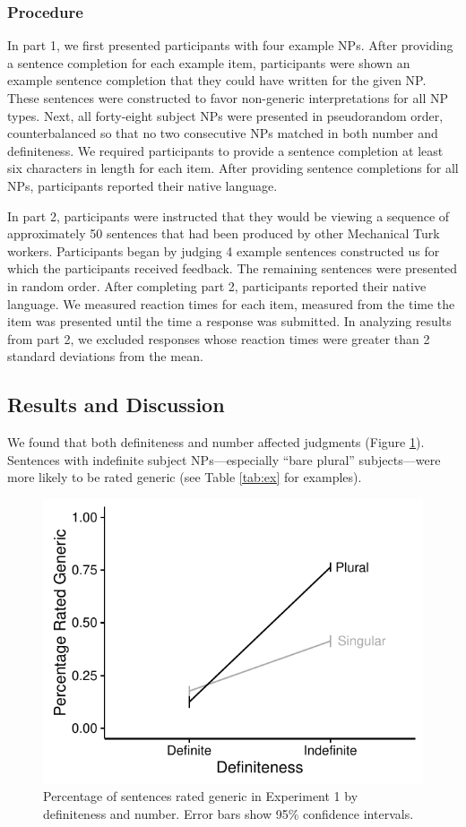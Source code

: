 \documentclass[10pt,letterpaper]{article}
\begin{document}
\subsubsection{Procedure}

In part 1, we first presented participants with four example NPs. After providing a sentence completion for each example item, participants were shown an example sentence completion that they could have written for the given NP. These sentences were constructed to favor non-generic interpretations for all NP types. Next, all forty-eight subject NPs were presented in pseudorandom order, counterbalanced so that no two consecutive NPs matched in both number and definiteness. We required participants to provide a sentence completion at least six characters in length for each item. After providing sentence completions for all NPs, participants reported their native language.

In part 2, participants were instructed that they would be viewing a sequence of approximately 50 sentences that had been produced by other Mechanical Turk workers. Participants began by judging 4 example sentences constructed us for which the participants received feedback. The remaining sentences were presented in random order. After completing part 2, participants reported their native language. We measured reaction times for each item, measured from the time the item was presented until the time a response was submitted.  In analyzing results from part 2, we excluded responses whose reaction times were greater than 2 standard deviations from the mean.

\subsection{Results and Discussion}

We found that both definiteness and number affected judgments (Figure \ref{fig:e2}). Sentences with indefinite subject NPs---especially ``bare plural'' subjects---were more likely to be rated generic (see Table \ref{tab:ex} for examples).

\begin{figure}[t]
\centering
\includegraphics[width=.8\linewidth]{figures/e2-2016.pdf}
\caption{\label{fig:e2} Percentage of sentences rated generic in Experiment 1 by definiteness and number. Error bars show 95\% confidence intervals.}
\end{figure}
\end{document}
